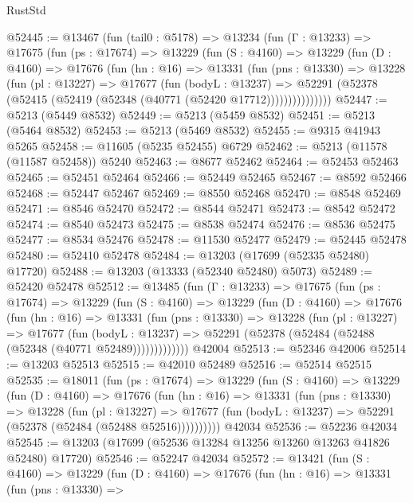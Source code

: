 \begin{lexlean}{RustStd}
\begin{coremodule}
@52445 := @13467
    (fun (tail0 : @5178) =>
    @13234
      (fun (Γ : @13233) =>
      @17675
        (fun (ps : @17674) =>
        @13229
          (fun (S : @4160) =>
          @13229
            (fun (D : @4160) =>
            @17676
              (fun (hn : @16) =>
              @13331
                (fun (pns : @13330) =>
                @13228
                  (fun (pl : @13227) =>
                  @17677
                    (fun (bodyL : @13237) =>
                    @52291 (@52378 (@52415 (@52419 (@52348 (@40771 (@52420 @17712)))))))))))))))
@52447 := @5213 (@5449 @8532)
@52449 := @5213 (@5459 @8532)
@52451 := @5213 (@5464 @8532)
@52453 := @5213 (@5469 @8532)
@52455 := @9315 @41943 @5265
@52458 := @11605 (@5235 @52455) @6729
@52462 := @5213 (@11578 (@11587 @52458)) @5240
@52463 := @8677 @52462
@52464 := @52453 @52463
@52465 := @52451 @52464
@52466 := @52449 @52465
@52467 := @8592 @52466
@52468 := @52447 @52467
@52469 := @8550 @52468
@52470 := @8548 @52469
@52471 := @8546 @52470
@52472 := @8544 @52471
@52473 := @8542 @52472
@52474 := @8540 @52473
@52475 := @8538 @52474
@52476 := @8536 @52475
@52477 := @8534 @52476
@52478 := @11530 @52477
@52479 := @52445 @52478
@52480 := @52410 @52478
@52484 := @13203 (@17699 (@52335 @52480) @17720)
@52488 := @13203 (@13333 (@52340 @52480) @5073)
@52489 := @52420 @52478
@52512 := @13485
    (fun (Γ : @13233) =>
    @17675
      (fun (ps : @17674) =>
      @13229
        (fun (S : @4160) =>
        @13229
          (fun (D : @4160) =>
          @17676
            (fun (hn : @16) =>
            @13331
              (fun (pns : @13330) =>
              @13228
                (fun (pl : @13227) =>
                @17677
                  (fun (bodyL : @13237) =>
                  @52291 (@52378 (@52484 (@52488 (@52348 (@40771 @52489)))))))))))))
    @42004
@52513 := @52346 @42006
@52514 := @13203 @52513
@52515 := @42010 @52489
@52516 := @52514 @52515
@52535 := @18011
    (fun (ps : @17674) =>
    @13229
      (fun (S : @4160) =>
      @13229
        (fun (D : @4160) =>
        @17676
          (fun (hn : @16) =>
          @13331
            (fun (pns : @13330) =>
            @13228
              (fun (pl : @13227) =>
              @17677 (fun (bodyL : @13237) => @52291 (@52378 (@52484 (@52488 @52516))))))))))
    @42034
@52536 := @52236 @42034
@52545 := @13203 (@17699 (@52536 @13284 @13256 @13260 @13263 @41826 @52480) @17720)
@52546 := @52247 @42034
@52572 := @13421
    (fun (S : @4160) =>
    @13229
      (fun (D : @4160) =>
      @17676
        (fun (hn : @16) =>
        @13331
          (fun (pns : @13330) =>

\end{coremodule}
\end{lexlean}
